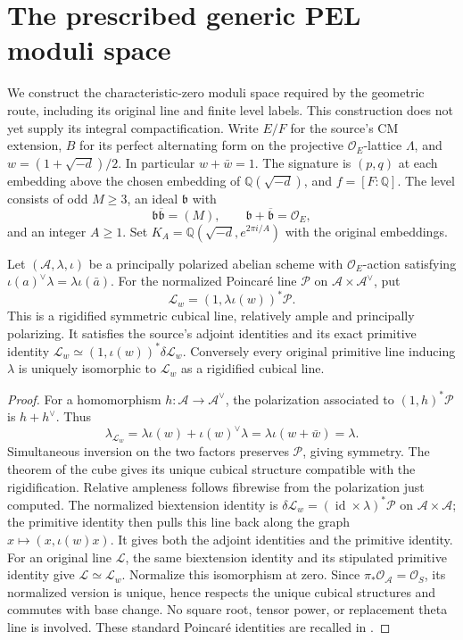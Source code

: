 \section{The prescribed generic PEL moduli space}
\label{sec:generic-pel-frontier}

We construct the characteristic-zero moduli space required by the
geometric route, including its original line and finite level labels.
This construction does not yet supply its integral compactification.
Write $E/F$ for the source's CM extension, $B$ for its perfect
alternating form on the projective $\mathcal O_E$-lattice $\Lambda$,
and $w=(1+\sqrt{-d})/2$. In particular $w+\bar w=1$.
The signature is $(p,q)$ at each embedding above the chosen embedding
of $\mathbb Q(\sqrt{-d})$, and $f=[F:\mathbb Q]$.
The level consists of odd $M\geq3$, an ideal $\mathfrak b$ with
\[
 \mathfrak b\overline{\mathfrak b}=(M),\qquad
 \mathfrak b+\overline{\mathfrak b}=\mathcal O_E,
\]
and an integer $A\geq1$. Set
$K_A=\mathbb Q(\sqrt{-d},e^{2\pi i/A})$ with the original embeddings.

\begin{proposition}\label{prop:pel-primitive-line}
Let $(\mathcal A,\lambda,\iota)$ be a principally polarized abelian
scheme with $\mathcal O_E$-action satisfying
$\iota(a)^\vee\lambda=\lambda\iota(\bar a)$.
For the normalized Poincar\'e line $\mathcal P$ on
$\mathcal A\times\mathcal A^\vee$, put
\[
 \mathcal L_w=(1,\lambda\iota(w))^*\mathcal P.
\]
This is a rigidified symmetric cubical line, relatively ample and
principally polarizing. It satisfies the source's adjoint identities
and its exact primitive identity
$\mathcal L_w\simeq(1,\iota(w))^*\delta\mathcal L_w$.
Conversely every original primitive line inducing $\lambda$ is
uniquely isomorphic to $\mathcal L_w$ as a rigidified cubical line.
\end{proposition}
\begin{proof}
For a homomorphism $h:\mathcal A\to\mathcal A^\vee$, the polarization
associated to $(1,h)^*\mathcal P$ is $h+h^\vee$. Thus
\[
 \lambda_{\mathcal L_w}
 =\lambda\iota(w)+\iota(w)^\vee\lambda
 =\lambda\iota(w+\bar w)=\lambda.
\]
Simultaneous inversion on the two factors preserves $\mathcal P$,
giving symmetry. The theorem of the cube gives its unique cubical
structure compatible with the rigidification. Relative ampleness
follows fibrewise from the polarization just computed. The normalized
biextension identity is
$\delta\mathcal L_w=(\operatorname{id}\times\lambda)^*\mathcal P$
on $\mathcal A\times\mathcal A$; the primitive identity then pulls
this line back along the graph $x\mapsto(x,\iota(w)x)$.
It gives both the adjoint identities and the primitive identity.
For an original line $\mathcal L$, the same biextension identity and
its stipulated primitive identity give $\mathcal L\simeq\mathcal L_w$.
Normalize this isomorphism at zero. Since
$\pi_*\mathcal O_{\mathcal A}=\mathcal O_S$, its normalized version
is unique, hence respects the unique cubical structures and commutes
with base change. No square root, tensor power, or replacement theta
line is involved. These standard Poincar\'e identities are recalled
in \cite[Sections 1.3.2, 3.2.2 and 5.2.4]{generic-pel-lan}.
\end{proof}


